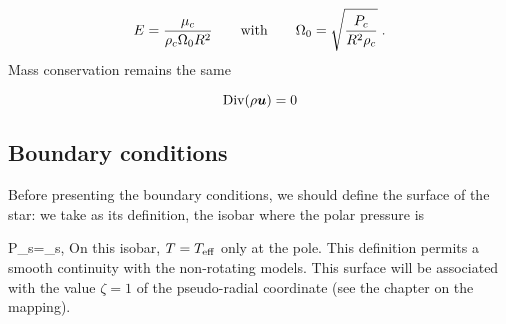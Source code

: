 \begin{equation} E = \frac{\mu_c}{\rho_c \Omega_0 R^2} {\qquad {\rm with}\qquad}
\Omega_0=\sqrt{\frac{P_c}{R^2\rho_c}}\; .\end{equation}
Mass conservation remains the same

\begin{equation} \Div(\rho\vu) =0\end{equation}

\subsection{Boundary conditions}

Before presenting the boundary conditions, we should define the surface
of the star: we take as its definition, the isobar where the polar
pressure is 

\beq P_s=\tau_s,\eeq
On this isobar, $T=T_{\rm eff}$ only at the pole. This definition
permits a smooth continuity with the non-rotating models. This surface
will be associated with the value $\zeta=1$ of the pseudo-radial
coordinate (see the chapter on the mapping).

